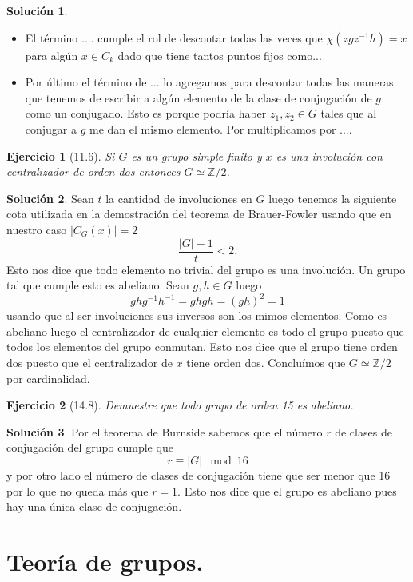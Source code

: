 \documentclass[11pt]{article}
\theoremstyle{plain}
\newtheorem*{ej}{Ejercicio}
\theoremstyle{definition}
\newtheorem*{sol}{Solución}
\theoremstyle{remark}
\newcommand\ZZ{\mathbb{Z}}
\begin{document}
\begin{sol}
\begin{itemize}
		\item El término .... cumple el rol de descontar todas las veces que $\chi(zgz^{-1}h) = x$ para algún $x \in C_k$ dado que tiene tantos puntos fijos como...
		
		\item Por último el término de ... lo agregamos para descontar todas las maneras que tenemos de escribir a algún elemento de la clase de conjugación de $g$ como un conjugado. Esto es porque podría haber $z_1,z_2 \in G$ tales que al conjugar a $g$ me dan el mismo elemento. Por multiplicamos por .... 
	\end{itemize}	
\end{sol}

\bigskip

\begin{tcolorbox}[colback=teal!25!white,colframe=teal!75!black]
	\begin{ej}[11.6]
		Si $G$ es un grupo simple finito y $x$ es una involución con centralizador de orden dos entonces $G \simeq \ZZ /2$.
	\end{ej}	
\end{tcolorbox}
\medskip

\begin{sol}
 Sean $t$ la cantidad de involuciones en $G$ luego tenemos la siguiente cota utilizada en la demostración del teorema de Brauer-Fowler usando que en nuestro caso $|C_G(x)|=2$
 \[
 \dfrac{|G|-1}{t} < 2.
 \]
 Esto nos dice que todo elemento no trivial del grupo es una involución. Un grupo tal que cumple esto es abeliano. Sean $g,h \in G$ luego
 \[
 ghg^{-1}h^{-1} = ghgh = (gh)^2 = 1
 \]
 usando que al ser involuciones sus inversos son los mimos elementos. Como es abeliano luego el centralizador de cualquier elemento es todo el grupo puesto que todos los elementos del grupo conmutan. Esto nos dice que el grupo tiene orden dos puesto que el centralizador de $x$ tiene orden dos. Concluímos que $G \simeq \ZZ/2$ por cardinalidad.
\end{sol}



\begin{tcolorbox}[colback=teal!25!white,colframe=teal!75!black]
	\begin{ej}[14.8]
		Demuestre que todo grupo de orden 15 es abeliano.
	\end{ej}	
\end{tcolorbox}
\medskip

\begin{sol}
	Por el teorema de Burnside sabemos que el número $r$ de clases de conjugación del grupo cumple que 
	\[
	r \equiv |G|  \mod 16
	\]
	y por otro lado el número de clases de conjugación tiene que ser menor que 16 por lo que no queda más que $r=1$. Esto nos dice que el grupo es abeliano pues hay una única clase de conjugación.
\end{sol}


\section{Teoría de grupos.}

	
\end{document}
